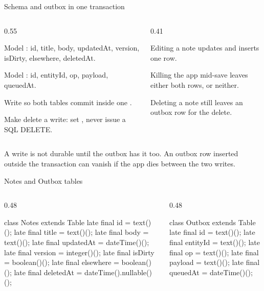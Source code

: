 \documentclass[10pt,aspectratio=169,t]{beamer}
\begin{document}
\begin{frame}[eyebrow=Task I]{Schema and outbox in one transaction}
  \begin{columns}[T]
    \begin{column}{0.55\textwidth}
      \begin{steps}
        \item Model : id, title, body, updatedAt, version, isDirty, elsewhere, deletedAt.
        \item Model : id, entityId, op, payload, queuedAt.
        \item Write  so both tables commit inside one .
        \item Make delete a write: set , never issue a SQL DELETE.
      \end{steps}
    \end{column}
    \begin{column}{0.41\textwidth}
      \begin{checklist}
        \item Editing a note updates  and inserts one  row.
        \item Killing the app mid-save leaves either both rows, or neither.
        \item Deleting a note still leaves an outbox row for the delete.
      \end{checklist}
    \end{column}
  \end{columns}
  \begin{takeaway}{A write is not durable until the outbox has it too.}
    An outbox row inserted outside the transaction can vanish if the app dies between the two writes.
  \end{takeaway}
\end{frame}

\begin{frame}[fragile,eyebrow=Task I]{Notes and Outbox tables}
  \begin{columns}[T]
    \begin{column}{0.48\textwidth}
\begin{dart}
class Notes extends Table {
  late final id = text()();
  late final title = text()();
  late final body = text()();
  late final updatedAt =
      dateTime()();
  late final version = integer()();
  late final isDirty = boolean()();
  late final elsewhere = boolean()();
  late final deletedAt =
      dateTime().nullable()();
}
\end{dart}
    \end{column}
    \begin{column}{0.48\textwidth}
\begin{dart}
class Outbox extends Table {
  late final id = text()();
  late final entityId = text()();
  late final op = text()();
  late final payload = text()();
  late final queuedAt = dateTime()();
}
\end{dart}
    \end{column}
  \end{columns}
\end{frame}
\end{document}
